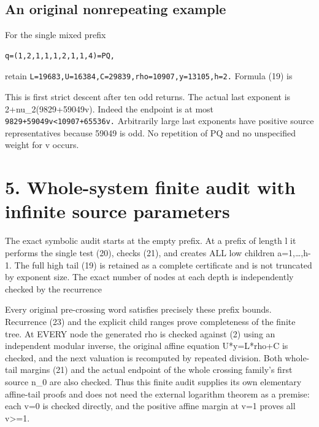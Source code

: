 \subsection{An original nonrepeating example}

For the single mixed prefix

\begin{Verbatim}[breaklines=true,breakanywhere=true,fontsize=\scriptsize]
q=(1,2,1,1,1,2,1,1,4)=PQ,
\end{Verbatim}

retain \nolinkurl{L=19683,U=16384,C=29839,rho=10907,y=13105,h=2.}
Formula (19) is


This is first strict descent after ten odd returns. The actual last
exponent is 2+nu\_2(9829+59049v). Indeed the endpoint is at most
\nolinkurl{9829+59049v<10907+65536v.} Arbitrarily large last exponents
have positive source representatives because 59049 is odd. No repetition
of PQ and no unspecified weight for v occurs.

\section{5. Whole-system finite audit with infinite source parameters}

The exact symbolic audit starts at the empty prefix. At a prefix of
length l it performs the single test (20), checks (21), and creates ALL
low children a=1,\ldots,h-1. The full high tail (19) is retained as a
complete certificate and is not truncated by exponent size. The exact
number of nodes at each depth is independently checked by the recurrence


Every original pre-crossing word satisfies precisely these prefix
bounds. Recurrence (23) and the explicit child ranges prove completeness
of the finite tree. At EVERY node the generated rho is checked against
(2) using an independent modular inverse, the original affine equation
U*y=L*rho+C is checked, and the next valuation is recomputed by repeated
division. Both whole-tail margins (21) and the actual endpoint of the
whole crossing family's first source n\_0 are also checked. Thus this
finite audit supplies its own elementary affine-tail proofs and does not
need the external logarithm theorem as a premise: each v=0 is checked
directly, and the positive affine margin at v=1 proves all
v\textgreater=1.

